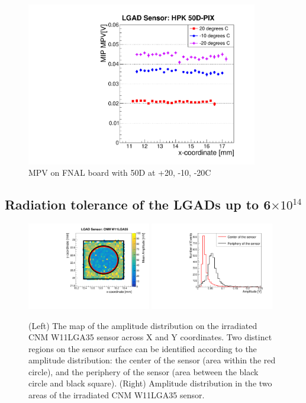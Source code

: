 \documentclass[preprint,1p]{elsarticle}
\begin{document}
\begin{figure}[htbp] 
\centering
\includegraphics[width=0.9\textwidth]{figs/FNAL_MPV_vs_X_HPK50D_TemperatureDependance.pdf} 
\caption{MPV on FNAL board with 50D at +20, -10, -20C} 
\label{fig:Sensors} 
\end{figure} 

\subsection{Radiation tolerance of the LGADs up to 6$\times 10^{14}$}
\label{sec:rad_tolerance}

\begin{figure}[htbp] 
\centering
\includegraphics[width=0.48\textwidth]{figs/USCSBoard_HPK50DIrradiated-CNMW11LGA35_Run936-961/CNM_irradiated_amp_Map.pdf} \hfill
\includegraphics[width=0.48\textwidth]{figs/USCSBoard_HPK50DIrradiated-CNMW11LGA35_Run936-961/CNM_irradiated_amp_1D.pdf} 
\caption{(Left) The map of the amplitude distribution on the irradiated CNM W11LGA35 sensor across X and Y coordinates. Two distinct regions on the sensor surface can be identified according to the amplitude distribution: the center of the sensor (area within the red circle), and the periphery of the sensor (area between the black circle and black square). (Right) Amplitude distribution in the two areas of the irradiated CNM W11LGA35 sensor.} 
\label{fig:Sensors} 
\end{figure} 
\end{document}

